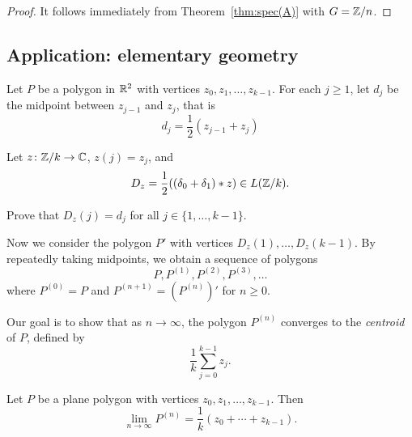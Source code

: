 \begin{proof}
    It follows immediately from Theorem~\ref{thm:spec(A)} with $G=\mathbb{Z}/n$.    
\end{proof}

\subsection{Application: elementary geometry}

Let $P$ be a polygon in $\mathbb{R}^2$ with vertices 
$z_0,z_1,\dots,z_{k-1}$. For each 
$j\geq1$, let $d_j$ be the midpoint between $z_{j-1}$ and $z_j$, that is 
  \[
	d_j=\frac12(z_{j-1}+z_j)
  \]

Let $z\colon\mathbb{Z}/k\to\mathbb{C}$, $z(j)=z_j$, and 
  \[
    D_z=\frac12((\delta_0+\delta_1)*z)\in L(\mathbb{Z}/k). 
  \]
  
\begin{exercise}
\label{xca:D_z}
    Prove that $D_z(j)=d_j$ for all $j\in\{1,\dots,k-1\}$.
\end{exercise}

Now we consider the polygon $P'$ with vertices 
  $D_z(1),\dots,D_z(k-1)$. By repeatedly taking midpoints, 
  we obtain a sequence of polygons 
  \[
  P,P^{(1)},P^{(2)},P^{(3)},\dots
  \]
  where 
  $P^{(0)}=P$ and 
  $P^{(n+1)}=(P^{(n)})'$ for $n\geq0$.

    Our goal is to show that as $n \to \infty$, the polygon $P^{(n)}$ converges to the \emph{centroid} of $P$, 
    defined by
  \[
	\frac{1}{k}\sum_{j=0}^{k-1}z_j.
  \]
  
  \begin{theorem}
	Let $P$ be a plane polygon with vertices $z_0,z_1,\dots,z_{k-1}$. Then 
   	\[
	  \lim_{n\to\infty}P^{(n)}=\frac{1}{k}(z_0+\cdots+z_{k-1}).
	\]
  \end{theorem}

